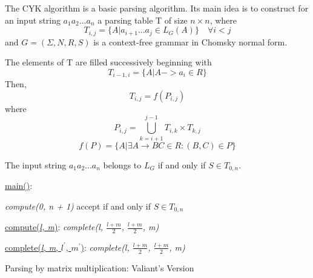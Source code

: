 \documentclass[runningheads]{llncs}
\begin{document}
The CYK algorithm is a basic parsing algorithm. Its main idea is to construct for an input string $a_{1}a_{2}...a_{n}$ a parsing table T of size $n \times n$,  where 
\begin{equation}
T_{i, j} =  \{ A |  a_{i + 1}...a_{j} \in L_{G}(A)\} \quad \forall i < j
\end{equation}
and $G = (\Sigma, N, R, S)$ is a context-free grammar in Chomsky normal form. 

The elements of T are filled successively beginning with 
\begin{equation}
T_{i - 1, i} = \{ A | A -> a_{i} \in R\}
\end{equation}
Then, 
\begin{equation}
T_{i, j} = f(P_{i, j})
\end{equation}
where 
\begin{equation}
P_{i, j} = \bigcup\limits_{k = i + 1}^{j - 1} T_{i,k} \times T_{k, j}
\end{equation}
\begin{equation}
f(P) = \{A | \exists A \rightarrow BC \in R : (B, C) \in P\}
\end{equation}

The input string $a_{1}a_{2}...a_{n}$ belongs to $L_{G}$ if and only if $S \in T_{0, n}$.

\begin{algorithm}
\SetAlgoNoLine
{}
\underline{main()}{:}{
 
 \textit{compute(0, n + 1)\;}
 accept if and only if $S \in T_{0, n}$
 \linebreak
 }
 
\underline{compute(\textit{l, m})}{:}{
 \textit{complete(l, $\frac{l+m}{2}$, $\frac{l+m}{2}$, m)}
 \linebreak
 }
 
\underline{complete(\textit{l, m}, $l^\prime$, $m^\prime$)}{:}{
 }
  \textit{complete(l, $\frac{l+m}{2}$, $\frac{l+m}{2}$, m)}
 
\caption{Parsing by matrix multiplication: Valiant's Version}
\end{algorithm}
\end{document}

